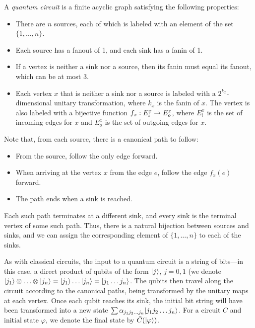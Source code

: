 \begin{definition}
A \textit{quantum circuit} is a finite acyclic graph satisfying the following
properties:
\begin{itemize}
\item There are $n$ sources, each of which is labeled with an element of the set
  $\{1,\ldots,n\}$.
\item Each source has a fanout of 1, and each sink has a fanin of 1.
\item If a vertex is neither a sink nor a source, then its fanin must equal its
  fanout, which can be at most 3.
\item Each vertex $x$ that is neither a sink nor a source is labeled with a
  $2^{k_x}$-dimensional unitary transformation, where $k_x$ is the fanin of
  $x$. The vertex is also labeled with a bijective function $f_x:E_i^x\rightarrow
  E_o^x$, where $E_i^x$ is the set of incoming edges for $x$ and $E_o^x$ is the
  set of outgoing edges for $x$.
\end{itemize}
\end{definition}
Note that, from each source, there is a canonical path to follow:
\begin{itemize}
\item From the source, follow the only edge forward.
\item When arriving at the vertex $x$ from the edge $e$, follow the edge
  $f_x(e)$ forward.
\item The path ends when a sink is reached.
\end{itemize}
Each such path terminates at a different sink, and every sink is the terminal
vertex of some such path. Thus, there is a natural bijection between sources and
sinks, and we can assign the corresponding element of $\{1,\ldots,n\}$  to
each of the sinks.

As with classical circuits, the input to a quantum circuit is a string of
bits---in this case, a direct product of qubits of the form $|j\rangle$,
$j=0,1$ (we denote
$|j_1\rangle\otimes\ldots\otimes|j_n\rangle=|j_1\rangle\ldots|j_n\rangle=|j_1\ldots 
j_n\rangle$. The qubits then travel along the circuit according to the canonical
paths, being transformed by the unitary maps at each vertex. Once each qubit
reaches its sink, the initial bit string will have been transformed into a new
state $\sum\alpha_{j_1j_2\ldots j_n}|j_1j_2\ldots j_n\rangle$. For a circuit $C$
and initial state $\varphi$, we denote the final state by $\bar
C(|\varphi\rangle)$.

